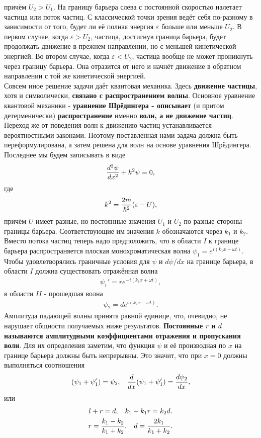 \documentclass[__main__.tex]{subfiles}
\begin{document}
причём $U_2>U_1$. На границу барьера слева с постоянной скоростью налетает частица или поток частиц. С классической точки зрения ведёт себя по-разному в зависимости от того, будет ли её полная энергия $\mathbb{\varepsilon}$ больше или меньше $U_2$. В первом случае, когда $\mathcal{\varepsilon}>U_2$, частица, достигнув граница барьера, будет продолжать движение в прежнем направлении, но с меньшей кинетической энергией. Во втором случае, когда $\varepsilon < U_2$, частица вообще не может проникнуть через границу барьера. Она отразится от него и начнёт движение в обратном направлении с той же кинетической энергией.\\
Совсем иное решение задачи даёт квантовая механика. Здесь \textbf{движение частицы}, хотя и символически, \textbf{связано с распространением волны}. Основное уравнение квантовой механики - \textbf{уравнение Шрёдингера - описывает} (и притом детерменически) \textbf{распространение} именно \textbf{волн, а не движение частиц}. Переход же от поведения волн к движению частиц устанавливается вероятностными законами. Поэтому поставленная нами задача должна быть переформулирована, а затем решена для волн на основе уравнения Шрёдингера. Последнее мы будем записывать в виде
\begin{gather}
\llabel{19-2b}
\frac{d^2\psi}{dx^2} + k^2\psi = 0,
\end{gather}
где
\begin{gather}
\llabel{19-3}
k^2 = \frac{2m}{\hbar^2}(\mathcal{\varepsilon} - U),
\end{gather}
причём $U$ имеет разные, но постоянные значения $U_1$ и $U_2$ по разные стороны границы барьера. Соответствующие им значения $k$ обозначаются через $k_1$ и $k_2$.\\
Вместо потока частиц теперь надо предположить, что в области $I$ к границе барьера распространяется плоская монохроматическая волна $\psi_1 = e^{i(k_1x-\omega t)}$.\\
Чтобы удовлетворялись граничные условия для $\psi$ и $d\psi/dx$ на границе барьера, в области $I$ должна существовать отражённая волна
\begin{gather*}
\psi_1' = re^{-i(k_1x+\omega t)},
\end{gather*}
в области $II$ - прошедшая волна	\begin{gather*}
\psi_2 = de^{i(k_2x - \omega t)}.
\end{gather*}
Амплитуда падающей волны принята равной единице, что, очевидно, не нарушает общности получаемых ниже результатов. \textbf{Постоянные $r$ и $d$ называются амплитудными коэффициентами отражения и пропускания волн}. Для их определения заметим, что функция $\psi$ и её производная по $x$ на границе барьера должны быть непрерывны. Это значит, что при $x = 0$ должны выполняться соотношения
\begin{gather*}
(\psi_1 + \psi_1') = \psi_2, \hspace{3mm} \frac{d}{dx}(\psi_1 + \psi_1') = \frac{d\psi_2}{dx},
\end{gather*}
или
\begin{gather*}
l + r = d, \hspace{3mm} k_1 - k_1r = k_2d.\\
r = \frac{k_1-k_2}{k_1 + k_2}, \hspace{3mm} d = \frac{2k_1}{k_1 + k_2}.
\end{gather*}
\end{document}
